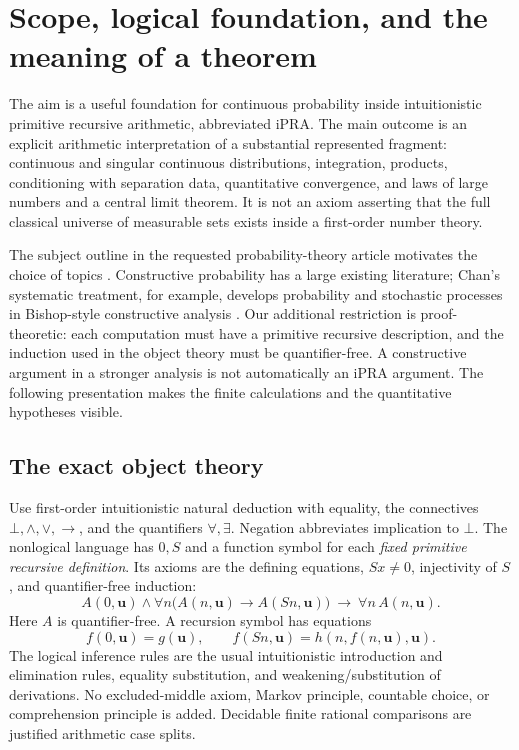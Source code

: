 \section{Scope, logical foundation, and the meaning of a theorem}
\label{sec:scope}

The aim is a useful foundation for continuous probability inside
intuitionistic primitive recursive arithmetic, abbreviated iPRA. The main
outcome is an explicit arithmetic interpretation of a substantial represented
fragment: continuous and singular continuous distributions, integration,
products, conditioning with separation data, quantitative convergence, and
laws of large numbers and a central limit theorem. It is not an axiom asserting
that the full classical universe of measurable sets exists inside a
first-order number theory.

The subject outline in the requested probability-theory article motivates
the choice of topics \cite{wikiProbability}. Constructive probability has a
large existing literature; Chan's systematic treatment, for example, develops
probability and stochastic processes in Bishop-style constructive analysis
\cite{chan}. Our additional restriction is proof-theoretic: each computation
must have a primitive recursive description, and the induction used in the
object theory must be quantifier-free. A constructive argument in a stronger
analysis is not automatically an iPRA argument. The following presentation
makes the finite calculations and the quantitative hypotheses visible.

\subsection{The exact object theory}

Use first-order intuitionistic natural deduction with equality, the
connectives $\bot,\wedge,\vee,\to$, and the quantifiers $\forall,\exists$.
Negation abbreviates implication to $\bot$. The nonlogical language has
$0,S$ and a function symbol for each \emph{fixed primitive recursive
definition}. Its axioms are the defining equations, $Sx\ne0$, injectivity
of $S$, and quantifier-free induction:
\[
 A(0,\mathbf u)\wedge
 \forall n\bigl(A(n,\mathbf u)\to A(Sn,\mathbf u)\bigr)
 \ \longrightarrow\ \forall n\,A(n,\mathbf u).
\]
Here $A$ is quantifier-free. A recursion symbol has equations
\[
 f(0,\mathbf u)=g(\mathbf u),\qquad
 f(Sn,\mathbf u)=h(n,f(n,\mathbf u),\mathbf u).
\]
The logical inference rules are the usual intuitionistic introduction and
elimination rules, equality substitution, and weakening/substitution of
derivations. No excluded-middle axiom, Markov principle, countable choice,
or comprehension principle is added. Decidable finite rational comparisons
are justified arithmetic case splits.

